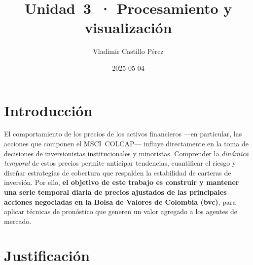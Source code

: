 \documentclass[
  11pt,
]{book}
\title{Unidad~3~· Procesamiento y visualización}
\author{Vladimir Castillo Pérez}
\date{2025-05-04}
\begin{document}
\maketitle

{
\setcounter{tocdepth}{1}
\tableofcontents
}
\chapter{Introducción}\label{introducciuxf3n}

El comportamiento de los precios de los activos financieros ---en particular, las acciones que componen el MSCI~COLCAP--- influye directamente en la toma de decisiones de inversionistas institucionales y minoristas. Comprender la \emph{dinámica temporal} de estos precios permite anticipar tendencias, cuantificar el riesgo y diseñar estrategias de cobertura que respalden la estabilidad de carteras de inversión. Por ello, \textbf{el objetivo de este trabajo es construir y mantener una serie temporal diaria de precios ajustados de las principales acciones negociadas en la Bolsa de Valores de Colombia (bvc)}, para aplicar técnicas de pronóstico que generen un valor agregado a los agentes de mercado.

\chapter{Justificación}\label{justificaciuxf3n}
\end{document}
